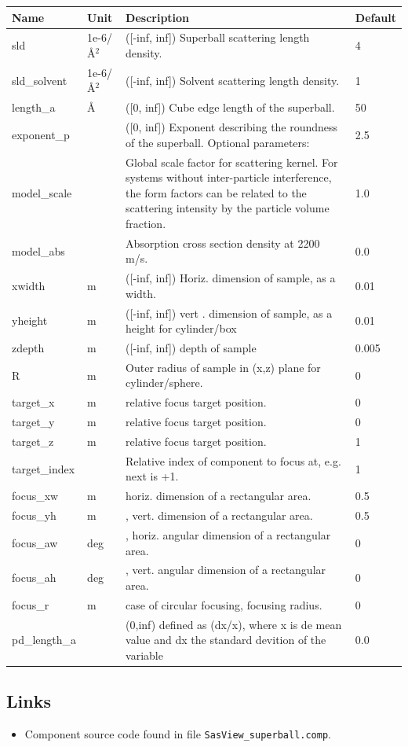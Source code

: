 \begin{longtable}{p{}p{}p{}p{}}
\toprule
\textbf{Name} & \textbf{Unit} & \textbf{Description} & \textbf{Default} \\
\midrule
\endhead
sld & 1e-6/\AA{}$^{2}$ & ([-inf, inf]) Superball scattering length density. & 4 \\
sld\_solvent & 1e-6/\AA{}$^{2}$ & ([-inf, inf]) Solvent scattering length density. & 1 \\
length\_a & \AA{} & ([0, inf]) Cube edge length of the superball. & 50 \\
exponent\_p &  & ([0, inf]) Exponent describing the roundness of the superball. Optional parameters: & 2.5 \\
model\_scale &   & Global scale factor for scattering kernel. For systems without inter-particle interference, the form factors can be related to the scattering intensity by the particle volume fraction. & 1.0 \\
model\_abs &   & Absorption cross section density at 2200 m/s. & 0.0 \\
xwidth & m & ([-inf, inf]) Horiz. dimension of sample, as a width. & 0.01 \\
yheight & m & ([-inf, inf]) vert . dimension of sample, as a height for cylinder/box & 0.01 \\
zdepth & m & ([-inf, inf]) depth of sample & 0.005 \\
R & m & Outer radius of sample in (x,z) plane for cylinder/sphere. & 0 \\
target\_x & m & relative focus target position. & 0 \\
target\_y & m & relative focus target position. & 0 \\
target\_z & m & relative focus target position. & 1 \\
target\_index &   & Relative index of component to focus at, e.g. next is +1. & 1 \\
focus\_xw & m & horiz. dimension of a rectangular area. & 0.5 \\
focus\_yh & m & , vert. dimension of a rectangular area. & 0.5 \\
focus\_aw & deg & , horiz. angular dimension of a rectangular area. & 0 \\
focus\_ah & deg & , vert. angular dimension of a rectangular area. & 0 \\
focus\_r & m & case of circular focusing, focusing radius. & 0 \\
pd\_length\_a &  & (0,inf) defined as (dx/x), where x is de mean value and dx the standard devition of the variable & 0.0 \\
\bottomrule
\end{longtable}

\subsection*{Links}
\begin{itemize}
  \item Component source code found in file \texttt{SasView\_superball.comp}.
\end{itemize}
